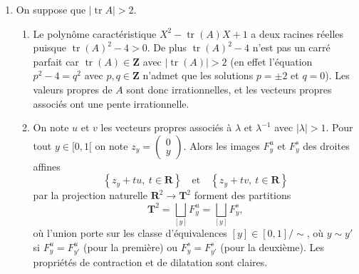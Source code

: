 \documentclass[a4paper,12pt,openany]{article}
\theoremstyle{plain}
\theoremstyle{definition}
\newcommand{\T}{\mathbf{T}}
\newcommand{\R}{\mathbf{R}}
\newcommand{\Z}{\mathbf{Z}}
\DeclareMathOperator{\tr}{tr}
\begin{document}
\begin{enumerate}
$$$$
On a $A u = u$ donc $a + b \alpha = 1$ et $\tr(A) = 2$ donc $a = 2 - d$. Par suite $d = 1 + b \alpha$ et donc si $v = \begin{pmatrix} 0 \\ x \end{pmatrix}$,
\begin{equation}\label{eq:rota}
A(v + tu) = x \begin{pmatrix} b \\ 1 + b \alpha  \end{pmatrix} + t u = v + (t + by) u.
\end{equation}
Pour $x \in [0,1[$ on note $C_y \subset \T^2$ l'image l'image de
$$
\left \{\begin{pmatrix} t \\ y + t \alpha \end{pmatrix},~t \in \R \right\}
$$
par la projection $\R^2 \to \T^2.$ Si $\alpha = p/q$ avec $p \in \Z$ et $q > 0$ premiers entre eux, on a $C_y \simeq \R/q\Z$ et sous cette identification, (\ref{eq:rota}) montre que $f_A|_{C_x}$ est la rotation $[\theta] \mapsto [\theta + by].$ De plus on a la partition
$$
\T^2 = \bigsqcup_{[y]} C_y
$$
o\`u l'union porte sur les classes d'\'equivalences $[y] \in [0,1] / \sim$ o\`u $y \sim y'$ si $C_y = C_{y'}$
\\
Si $\tr(A) = -2$, on applique le raisonnement pr\'ec\'edent \`a $A^2$.
\item On suppose que $|{\tr A}| > 2$.
\begin{enumerate}
\item Le polyn\^ome caract\'eristique $X^2 - \tr(A) X +1$ a deux racines r\'eelles puisque $\tr(A)^2 - 4 > 0$. De plus $\tr(A)^2 - 4$ n'est pas un carr\'e parfait car $\tr(A) \in \Z$ avec $|\tr(A)| > 2$ (en effet l'\'equation $p^2 - 4 = q^2$ avec $p,q \in \Z$ n'admet que les solutions $p = \pm 2$ et $q=0$). Les valeurs propres de $A$ sont donc irrationnelles, et les vecteurs propres associ\'es ont une pente irrationnelle.
\item On note $u$ et $v$ les vecteurs propres associ\'es \`a $\lambda$ et $\lambda^{-1}$ avec $|\lambda| > 1$. Pour tout $y \in [0,1[$ on note $z_y = \begin{pmatrix} 0 \\ y  \end{pmatrix}$. Alors les images $F^u_y$ et $F^s_y$ des droites affines
$$
\left\{ z_y + t u, ~t \in \R\right\} \quad \text{et} \quad \left\{ z_y + t v, ~t \in \R\right\}
$$
par la projection naturelle $\R^2 \to \T^2$ forment des partitions
$$
\T^2 = \bigsqcup_{[y]} F^u_y = \bigsqcup_{[y]} F^s_y,
$$
o\`u l'union porte sur les classe d'\'equivalences $[y] \in [0,1] / \sim$, o\`u $y \sim y'$ si $F^u_y = F^u_{y'}$ (pour la premi\`ere) ou $F^s_y = F^s_{y'}$ (pour la deuxi\`eme). Les propri\'et\'es de contraction et de dilatation sont claires.

\end{enumerate}
\end{enumerate}
\hfill \break 
\end{document}
